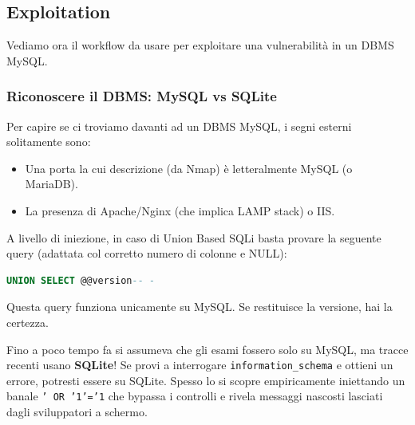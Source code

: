 \documentclass[12pt,a4paper]{report}
\begin{document}
	\subsection{Exploitation}
	Vediamo ora il workflow da usare per exploitare una vulnerabilità in un DBMS MySQL.
	
	\subsubsection{Riconoscere il DBMS: MySQL vs SQLite}
	Per capire se ci troviamo davanti ad un DBMS MySQL, i segni esterni solitamente sono:
	\begin{itemize}
		\item Una porta la cui descrizione (da Nmap) è letteralmente MySQL (o MariaDB).
		\item La presenza di Apache/Nginx (che implica LAMP stack) o IIS.
	\end{itemize}
	A livello di iniezione, in caso di Union Based SQLi basta provare la seguente query (adattata col corretto numero di colonne e NULL):
	\begin{lstlisting}[language=SQL]
		UNION SELECT @@version-- -
	\end{lstlisting}
	Questa query funziona unicamente su MySQL. Se restituisce la versione, hai la certezza.
	
	\begin{nota}
		Fino a poco tempo fa si assumeva che gli esami fossero solo su MySQL, ma tracce recenti usano \textbf{SQLite}! Se provi a interrogare \texttt{information\_schema} e ottieni un errore, potresti essere su SQLite. Spesso lo si scopre empiricamente iniettando un banale \texttt{' OR '1'='1} che bypassa i controlli e rivela messaggi nascosti lasciati dagli sviluppatori a schermo.
	\end{nota}
	
\end{document}
